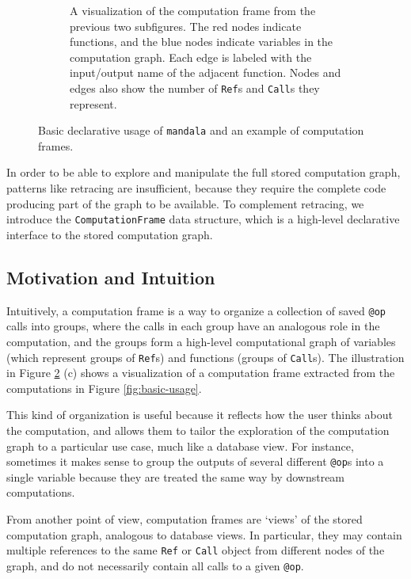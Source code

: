 \documentclass{article} %
\begin{document}
\begin{figure}[htbp]
\begin{minipage}[b]{0.45\textwidth}
\begin{subfigure}[b]{\textwidth}
            \caption{A visualization of the computation frame from the previous
            two subfigures. The red nodes indicate functions, and the blue nodes
            indicate variables in the computation graph. Each edge is labeled
            with the input/output name of the adjacent function. Nodes and edges
            also show the number of \texttt{Ref}s and \texttt{Call}s they
            represent.}
            \label{fig:figure3}
        \end{subfigure}
    \end{minipage}
    \caption{Basic declarative usage of \texttt{mandala} and an example of
computation frames.}
    \label{fig:cf}
\end{figure}

In order to be able to explore and manipulate the full stored computation graph,
patterns like retracing are insufficient, because they require the complete code
producing part of the graph to be available. To complement retracing, we
introduce the \texttt{ComputationFrame} data structure, which is a high-level
declarative interface to the stored computation graph.

\subsection{Motivation and Intuition}
\label{subsection:cf-motivation-intuition}

Intuitively, a computation frame is a way to organize a collection of saved
\texttt{@op} calls into groups, where the calls in each group have an analogous
role in the computation, and the groups form a high-level computational graph of
variables (which represent groups of \texttt{Ref}s) and functions (groups of
\texttt{Call}s). The illustration in Figure \ref{fig:cf} (c) shows a
visualization of a computation frame extracted from the computations in Figure
\ref{fig:basic-usage}.

This kind of organization is useful because it reflects how the user thinks
about the computation, and allows them to tailor the exploration of the
computation graph to a particular use case, much like a database view. For
instance, sometimes it makes sense to group the outputs of several different
\texttt{@op}s into a single variable because they are treated the same way by
downstream computations.

From another point of view, computation frames are `views' of the stored
computation graph, analogous to database views. In particular, they may contain
multiple references to the same \texttt{Ref} or \texttt{Call} object from
different nodes of the graph, and do not necessarily contain all calls to a
given \texttt{@op}.
\end{document}
